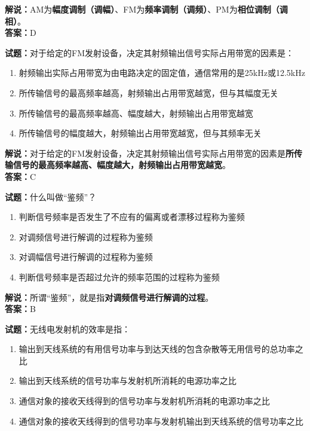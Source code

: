 \documentclass{ctexbook}
\begin{document}
\noindent\textbf{解说：}AM为\textbf{幅度调制（调幅）}、FM为\textbf{频率调制（调频）}、PM为\textbf{相位调制（调相）}。\\\noindent\textbf{答案：}D%

\vspace{\baselineskip}

\noindent\textbf{试题：}对于给定的FM发射设备，决定其射频输出信号实际占用带宽的因素是：

\begin{enumerate}[leftmargin=3em]
  \item 射频输出实际占用带宽为由电路决定的固定值，通信常用的是25\si{\kHz}或12.5\si{\kHz}
  \item 所传输信号的最高频率越高，射频输出占用带宽越宽，但与其幅度无关
  \item 所传输信号的最高频率越高、幅度越大，射频输出占用带宽越宽
  \item 所传输信号的幅度越大，射频输出占用带宽越宽，但与其频率无关
\end{enumerate}

\noindent\textbf{解说：}对于给定的FM发射设备，决定其射频输出信号实际占用带宽的因素是\textbf{所传输信号的最高频率越高、幅度越大，射频输出占用带宽越宽}。\\\noindent\textbf{答案：}C%

\vspace{\baselineskip}

\noindent\textbf{试题：}什么叫做“鉴频”？

\begin{enumerate}[leftmargin=3em]
  \item 判断信号频率是否发生了不应有的偏离或者漂移过程称为鉴频
  \item 对调频信号进行解调的过程称为鉴频
  \item 对调幅信号进行解调的过程称为鉴频
  \item 判断信号频率是否超过允许的频率范围的过程称为鉴频
\end{enumerate}

\noindent\textbf{解说：}所谓“鉴频”，就是指\textbf{对调频信号进行解调的过程}。\\\noindent\textbf{答案：}B

\vspace{\baselineskip}

\noindent\textbf{试题：}无线电发射机的效率是指：

\begin{enumerate}[leftmargin=3em]
  \item 输出到天线系统的有用信号功率与到达天线的包含杂散等无用信号的总功率之比
  \item 输出到天线系统的信号功率与发射机所消耗的电源功率之比
  \item 通信对象的接收天线得到的信号功率与发射机所消耗的电源功率之比
  \item 通信对象的接收天线得到的信号功率与发射机输出到天线系统的信号功率之比
\end{enumerate}
\end{document}
